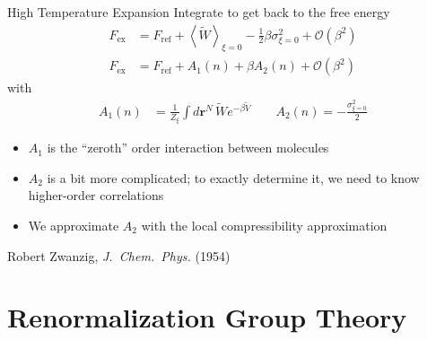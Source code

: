 \documentclass[xcolor=dvipsnames]{beamer}
\newcommand{\mycite}[3]{{\tiny #1, \textit{#2} (#3)}}
\newcommand{\Fex}{\ensuremath{F_\text{ex}}}
\newcommand{\rr}{\ensuremath{\mathbf{r}}}
\newcommand{\Vtilde}{\ensuremath{\widetilde{V}}}
\newcommand{\Wtilde}{\ensuremath{\widetilde{W}}}
\begin{document}

\begin{frame}{High Temperature Expansion}
  Integrate to get back to the free energy
  \begin{align*}
    \Fex &= F_\text{ref} + \left\langle \Wtilde \right\rangle_{\xi=0} - \frac{1}{2}\beta\sigma_{\xi=0}^2 + \mathcal{O}(\beta^2) \\
    \Fex &= F_\text{ref} + A_1(n) + \beta A_2(n) + \mathcal{O}(\beta^2)
  \end{align*}
  with
  \begin{align*}
    A_1(n) &= \frac{1}{Z_\xi}\int d\rr^N\, \Wtilde e^{-\beta\Vtilde} \qquad A_2(n) = -\frac{\sigma_{\xi=0}^2}{2}
  \end{align*}
  \begin{itemize}
    \item $A_1$ is the ``zeroth'' order interaction between molecules
    \item $A_2$ is a bit more complicated; to exactly determine it, we need to know higher-order correlations
    \item We approximate $A_2$ with the local compressibility approximation
  \end{itemize}
  \mycite{Robert Zwanzig}{J.~Chem.~Phys.}{1954}
\end{frame}

\section[RGT]{Renormalization Group Theory}
\end{document}
